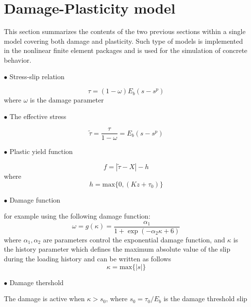 \documentclass[main.tex]{subfiles}
\begin{document}
%

\section{Damage-Plasticity model}

This section summarizes the contents of the two previous sections within a single model
covering both damage and plasticity. Such type of models is implemented in the nonlinear
finite element packages and is used for the simulation of concrete behavior.
\begin{description}
  \item[$\bullet$ Stress-slip relation] 
\end{description}
\begin{equation}
\tau = (1 - \omega)E_b (s - s^p)
\end{equation}
where $\omega$ is the damage parameter

\begin{description}
  \item[$\bullet$ The effective stress] 
\end{description}
\begin{equation}
\tilde{\tau} = \frac{\tau}{1-\omega} = E_b (s - s^p)
\end{equation}

\begin{description}
  \item[$\bullet$ Plastic yield function] 
\end{description}
\begin{equation}
f = |\tilde{\tau} - X| - h
\end{equation}
where
\begin{equation}
h = \mathrm{max}\{0 , (K z + \tau_0)\}
\end{equation}

\begin{description}
  \item[$\bullet$ Damage function] 
\end{description}
for example using the following damage function:
\begin{equation}
\omega = g(\kappa) = \frac{\alpha_1}{1 + \exp(-\alpha_2 \kappa + 6 )}
\end{equation}
where $\alpha_1, \alpha_2$ are parameters control the exponential damage function, and $\kappa$ is the history parameter which defines the maximum absolute value of the slip during the loading history and can be written as follows
\begin{equation}
\kappa = \mathrm{max} \{|s|\}
\end{equation}
\begin{description}
  \item[$\bullet$ Damage thershold] 
\end{description}
The damage is active when $\kappa > s_0$, 
where $s_0 = \tau_0 / E_b$ is the damage threshold slip
\end{document}
